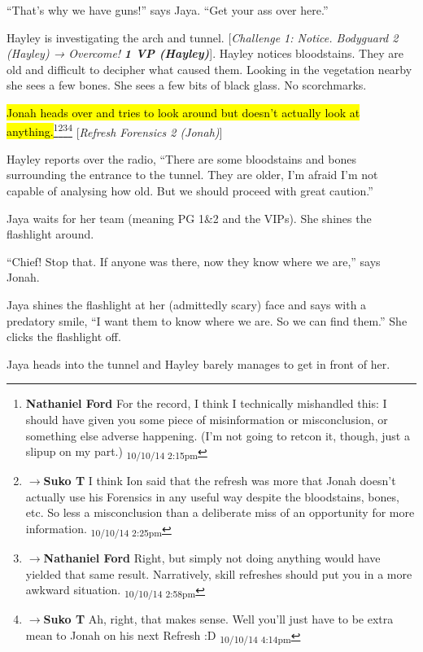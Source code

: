 ``That's why we have guns!'' says Jaya.  ``Get your ass over here.''

Hayley is investigating the arch and tunnel.  {[}\textit{Challenge 1: Notice.  Bodyguard 2 (Hayley) → Overcome! }\textit{\textbf{1 VP (Hayley)}}{]}.   Hayley notices bloodstains.  They are old and difficult to decipher what caused them.  Looking in the vegetation nearby she sees a few bones.  She sees a few bits of black glass.  No scorchmarks.

\hl{Jonah heads over and tries to look around but doesn't actually look at anything.}\footnote{\textbf{Nathaniel Ford }For the record, I think I technically mishandled this: I should have given you some piece of misinformation or misconclusion, or something else adverse happening. (I'm not going to retcon it, though, just a slipup on my part.) \textsubscript{10/10/14 2:15pm}}\footnote{$\rightarrow$\textbf{Suko T }I think Ion said that the refresh was more that Jonah doesn't actually use his Forensics in any useful way despite the bloodstains, bones, etc.  So less a misconclusion than a deliberate miss of an opportunity for more information. \textsubscript{10/10/14 2:25pm}}\footnote{$\rightarrow$\textbf{Nathaniel Ford }Right, but simply not doing anything would have yielded that same result. Narratively, skill refreshes should put you in a more awkward situation. \textsubscript{10/10/14 2:58pm}}\footnote{$\rightarrow$\textbf{Suko T }Ah, right, that makes sense. Well you'll just have to be extra mean to Jonah on his next Refresh :D \textsubscript{10/10/14 4:14pm}} {[}\textit{Refresh Forensics 2 (Jonah)}{]}

Hayley reports over the radio, ``There are some bloodstains and bones surrounding the entrance to the tunnel.  They are older, I'm afraid I'm not capable of analysing how old.  But we should proceed with great caution.''

Jaya waits for her team (meaning PG 1\&2 and the VIPs).  She shines the flashlight around.

``Chief!  Stop that.  If anyone was there, now they know where we are,'' says Jonah.

Jaya shines the flashlight at her (admittedly scary) face and says with a predatory smile, ``I want them to know where we are.  So we can find them.'' She clicks the flashlight off.



Jaya heads into the tunnel and Hayley barely manages to get in front of her.  




